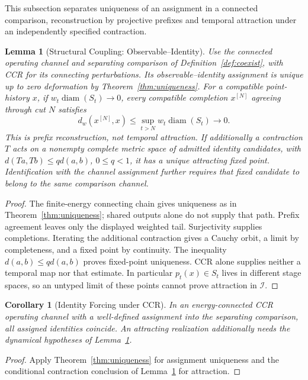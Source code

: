 \documentclass[11pt,a4paper]{article}
\theoremstyle{plain}
\newtheorem{lemma}[theorem]{Lemma}
\newtheorem{corollary}[theorem]{Corollary}
\theoremstyle{definition}
\theoremstyle{remark}
\begin{document}
This subsection separates uniqueness of an assignment in a connected comparison, reconstruction by projective prefixes and temporal attraction under an independently specified contraction.

\begin{lemma}[Structural Coupling: Observable--Identity]\label{lem:bridge-identity}
Use the connected operating channel and separating comparison of Definition~\ref{def:coexist}, with CCR for its connecting perturbations. Its observable--identity assignment is unique up to zero deformation by Theorem~\ref{thm:uniqueness}. For a compatible point-history $x$, if $w_t\operatorname{diam}(S_t)\to0$, every compatible completion $x^{[N]}$ agreeing through cut $N$ satisfies
\[
 d_w(x^{[N]},x)\le\sup_{t>N}w_t\operatorname{diam}(S_t)\longrightarrow0.
\]
This is prefix reconstruction, not temporal attraction. If additionally a contraction $T$ acts on a nonempty complete metric space of admitted identity candidates, with $d(Ta,Tb)\le qd(a,b)$, $0\le q<1$, it has a unique attracting fixed point. Identification with the channel assignment further requires that fixed candidate to belong to the same comparison channel.
\end{lemma}
\begin{proof}
The finite-energy connecting chain gives uniqueness as in Theorem~\ref{thm:uniqueness}; shared outputs alone do not supply that path. Prefix agreement leaves only the displayed weighted tail. Surjectivity supplies completions. Iterating the additional contraction gives a Cauchy orbit, a limit by completeness, and a fixed point by continuity. The inequality $d(a,b)\le qd(a,b)$ proves fixed-point uniqueness. CCR alone supplies neither a temporal map nor that estimate. In particular $p_t(x)\in S_t$ lives in different stage spaces, so an untyped limit of these points cannot prove attraction in $\mathcal I$.
\end{proof}

\begin{corollary}[Identity Forcing under CCR]\label{cor:identity-forcing}
In an energy-connected CCR operating channel with a well-defined assignment into the separating comparison, all assigned identities coincide. An attracting realization additionally needs the dynamical hypotheses of Lemma~\ref{lem:bridge-identity}.
\end{corollary}
\begin{proof}
Apply Theorem~\ref{thm:uniqueness} for assignment uniqueness and the conditional contraction conclusion of Lemma~\ref{lem:bridge-identity} for attraction.
\end{proof}
\end{document}
